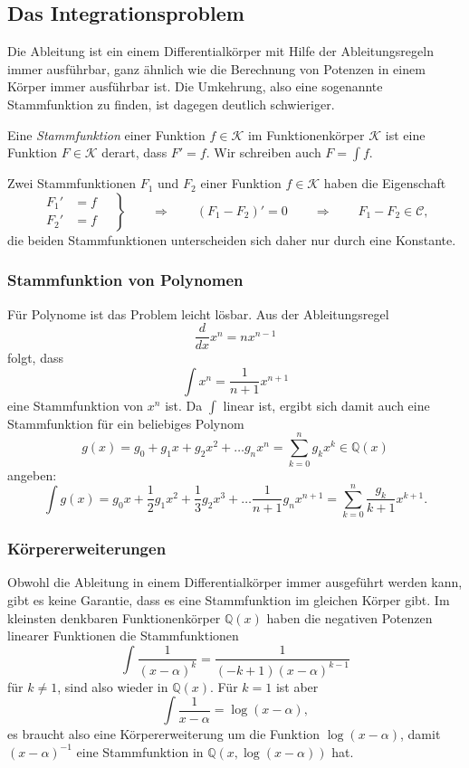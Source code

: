 %
%
%
\subsection{Das Integrationsproblem
\label{buch:integral:subsection:integrationsproblem}}
%
Die Ableitung ist ein einem Differentialkörper mit Hilfe der Ableitungsregeln
immer ausführbar, ganz ähnlich wie die Berechnung von Potenzen in einem Körper
immer ausführbar ist.
Die Umkehrung, also eine sogenannte Stammfunktion zu finden, ist dagegen
deutlich schwieriger.

\begin{definition}
Eine {\em Stammfunktion} einer Funktion $f\in\mathscr{K}$ im Funktionenkörper
$\mathscr{K}$ ist eine Funktion $F\in\mathscr{K}$ derart, dass $F'=f$.
Wir schreiben auch $F=\int f$.
\end{definition}

Zwei Stammfunktionen $F_1$ und $F_2$ einer Funktion $f\in\mathscr{K}$
haben die Eigenschaft
\[
\left.\begin{aligned}
F_1' &= f \\
F_2' &= f 
\end{aligned}\quad\right\}
\qquad
\Rightarrow
\qquad
(F_1-F_2)' = 0
\qquad\Rightarrow\qquad
F_1-F_2\in\mathscr{C},
\]
die beiden Stammfunktionen unterscheiden sich daher nur durch eine
Konstante.

\subsubsection{Stammfunktion von Polynomen}
Für Polynome ist das Problem leicht lösbar.
Aus der Ableitungsregel
\[
\frac{d}{dx} x^n = nx^{n-1}
\]
folgt, dass
\[
\int x^n = \frac{1}{n+1} x^{n+1}
\]
eine Stammfunktion von $x^n$ ist.
Da $\int$ linear ist, ergibt sich damit auch eine Stammfunktion für
ein beliebiges Polynom
\[
g(x)
=
g_0 + g_1x + g_2x^2 + \dots g_nx^n
=
\sum_{k=0}^n g_kx^k
\in\mathbb{Q}(x)
\]
angeben:
\begin{equation}
\int g(x)
=
g_0x + \frac12g_1x^2 + \frac13g_2x^3 + \dots \frac{1}{n+1}g_nx^{n+1}
=
\sum_{k=0}^n 
\frac{g_k}{k+1}x^{k+1}.
\label{buch:integral:iproblem:eqn:polyintegral}
\end{equation}

\subsubsection{Körpererweiterungen}
Obwohl die Ableitung in einem Differentialkörper immer ausgeführt werden 
kann, gibt es keine Garantie, dass es eine Stammfunktion im gleichen 
Körper gibt.
Im kleinsten denkbaren Funktionenkörper $\mathbb{Q}(x)$
haben die negativen Potenzen linearer Funktionen die Stammfunktionen
\[
\int
\frac{1}{(x-\alpha)^k}
=
\frac{1}{(-k+1)(x-\alpha)^{k-1}}
\]
für $k\ne 1$, sind also wieder in $\mathbb{Q}(x)$.
Für $k=1$ ist aber
\[
\int \frac{1}{x-\alpha}
=
\log(x-\alpha),
\]
es braucht also eine Körpererweiterung um die Funktion $\log(x-\alpha)$, damit
$(x-\alpha)^{-1}$ eine Stammfunktion in $\mathbb{Q}(x,\log(x-\alpha))$
hat.

